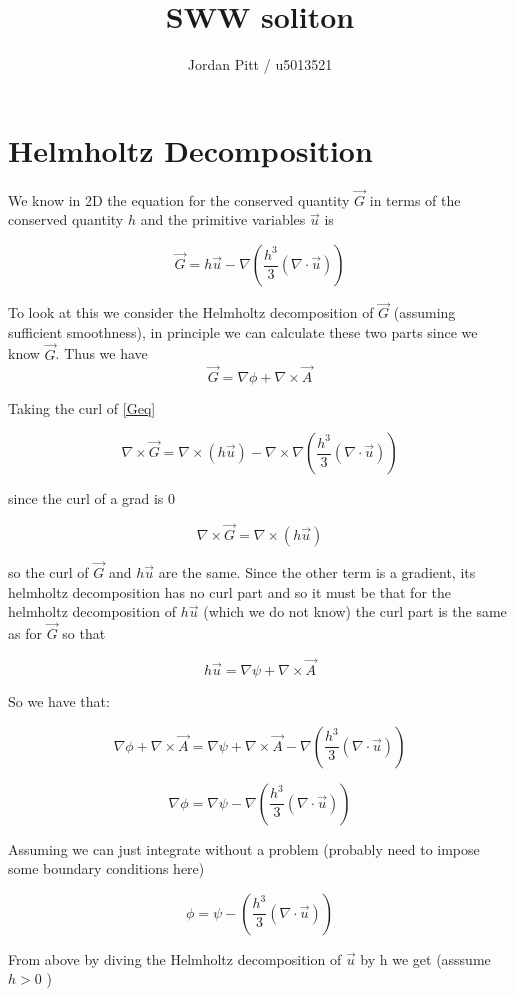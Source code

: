 \documentclass[12pt]{article}
\begin{document}
\title{SWW soliton}
\author{Jordan Pitt / u5013521}

\section{Helmholtz Decomposition}
We know in 2D the equation for the conserved quantity $\vec{G}$ in terms of the conserved quantity $h$ and the primitive variables $\vec{u}$ is

\begin{equation}
\label{Geq}
\vec{G} = h\vec{u} - \nabla\left(\frac{h^3}{3} \left(\nabla \cdot \vec{u}\right)\right)
\end{equation}

To look at this we consider the Helmholtz decomposition of $\vec{G}$ (assuming sufficient smoothness), in principle we can calculate these two parts since we know $\vec{G}$. Thus we have
\[\vec{G} = \nabla \phi + \nabla \times \vec{A}\] 

Taking the curl of \eqref{Geq}

\[\nabla \times \vec{G} = \nabla \times\left(h\vec{u} \right)-\nabla \times \nabla\left(\frac{h^3}{3} \left(\nabla \cdot \vec{u}\right)\right)\]

since the curl of a grad is 0

\[\nabla \times \vec{G} = \nabla \times\left(h\vec{u} \right)\]

so the curl of $\vec{G}$ and $h\vec{u}$ are the same. Since the other term is a gradient, its helmholtz decomposition has no curl part and so it must be that for the helmholtz decomposition of $h\vec{u}$ (which we do not know) the curl part is the same as for $\vec{G}$ so that

\[h\vec{u} = \nabla \psi + \nabla \times \vec{A}\]

So we have that:

\[\nabla \phi + \nabla \times \vec{A} = \nabla \psi + \nabla \times \vec{A} - \nabla\left(\frac{h^3}{3} \left(\nabla \cdot \vec{u}\right)\right)\]

\[\nabla \phi = \nabla \psi - \nabla\left(\frac{h^3}{3} \left(\nabla \cdot \vec{u}\right)\right)\]

Assuming we can just integrate without a problem (probably need to impose some boundary conditions here)

\[ \phi = \psi - \left(\frac{h^3}{3} \left(\nabla \cdot \vec{u}\right)\right)\]

From above by diving the Helmholtz decomposition of $\vec{u}$ by h we get (asssume $h > 0$ )
\end{document}
